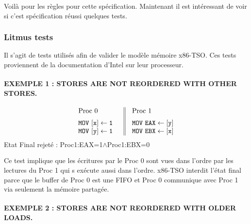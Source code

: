 \documentclass[12pt,a4paper]{article}
\begin{document}
Voilà pour les règles pour cette spécification. Maintenant il est intéressant de voir si c'est spécification réussi quelques tests.

\subsubsection*{Litmus tests}

Il s'agit de tests utilisés afin de valider le modèle mémoire x86-TSO. Ces tests proviennent de la documentation d'Intel sur leur processeur.

\paragraph{EXEMPLE 1 : STORES ARE NOT REORDERED WITH OTHER STORES.}

\begin{center}
\[
\begin{array}{c||c}
  \begin{array}{l}
  	\vspace{0.2cm}
    \text{Proc 0} \hspace{1.0cm}\\
    \mathtt{MOV \text{ } [x] \leftarrow 1} \\
    \mathtt{MOV \text{ } [y] \leftarrow 1} \\
  \end{array}&
  \begin{array}{l}
  \vspace{0.2cm}
   \text{Proc 1} \\
    \mathtt{MOV \text{ } EAX \leftarrow [y]} \\
    \mathtt{MOV \text{ } EBX \leftarrow [x]} \\
  \end{array}
\end{array}
\]
Etat Final rejeté : Proc1:EAX=1$\land$Proc1:EBX=0
\end{center}

Ce test implique que les écritures par le Proc 0 sont vues dans l'ordre par les lectures du Proc 1 qui s exécute aussi dans l'ordre. x86-TSO interdit l'état final parce que le buffer de Proc 0 est une FIFO et Proc 0 communique avec Proc 1 via seulement la mémoire partagée.

\paragraph{EXEMPLE 2 : STORES ARE NOT REORDERED WITH OLDER LOADS.}
\end{document}
